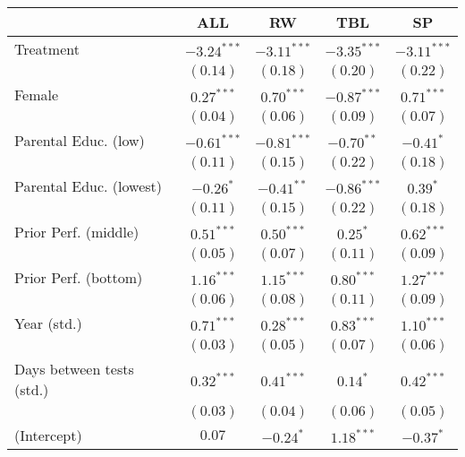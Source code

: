 
\begin{table}
\begin{center}
\begin{tabular}{l c c c c}
\hline
 & ALL & RW & TBL & SP \\
\hline
Treatment                         & $-3.24^{***}$ & $-3.11^{***}$ & $-3.35^{***}$ & $-3.11^{***}$ \\
                                  & $(0.14)$      & $(0.18)$      & $(0.20)$      & $(0.22)$      \\
Female                            & $0.27^{***}$  & $0.70^{***}$  & $-0.87^{***}$ & $0.71^{***}$  \\
                                  & $(0.04)$      & $(0.06)$      & $(0.09)$      & $(0.07)$      \\
Parental Educ. (low)              & $-0.61^{***}$ & $-0.81^{***}$ & $-0.70^{**}$  & $-0.41^{*}$   \\
                                  & $(0.11)$      & $(0.15)$      & $(0.22)$      & $(0.18)$      \\
Parental Educ. (lowest)           & $-0.26^{*}$   & $-0.41^{**}$  & $-0.86^{***}$ & $0.39^{*}$    \\
                                  & $(0.11)$      & $(0.15)$      & $(0.22)$      & $(0.18)$      \\
Prior Perf. (middle)              & $0.51^{***}$  & $0.50^{***}$  & $0.25^{*}$    & $0.62^{***}$  \\
                                  & $(0.05)$      & $(0.07)$      & $(0.11)$      & $(0.09)$      \\
Prior Perf. (bottom)              & $1.16^{***}$  & $1.15^{***}$  & $0.80^{***}$  & $1.27^{***}$  \\
                                  & $(0.06)$      & $(0.08)$      & $(0.11)$      & $(0.09)$      \\
Year (std.)                       & $0.71^{***}$  & $0.28^{***}$  & $0.83^{***}$  & $1.10^{***}$  \\
                                  & $(0.03)$      & $(0.05)$      & $(0.07)$      & $(0.06)$      \\
Days between tests (std.)         & $0.32^{***}$  & $0.41^{***}$  & $0.14^{*}$    & $0.42^{***}$  \\
                                  & $(0.03)$      & $(0.04)$      & $(0.06)$      & $(0.05)$      \\
(Intercept)                       & $0.07$        & $-0.24^{*}$   & $1.18^{***}$  & $-0.37^{*}$   \\

\end{tabular}
\end{center}
\end{table}
